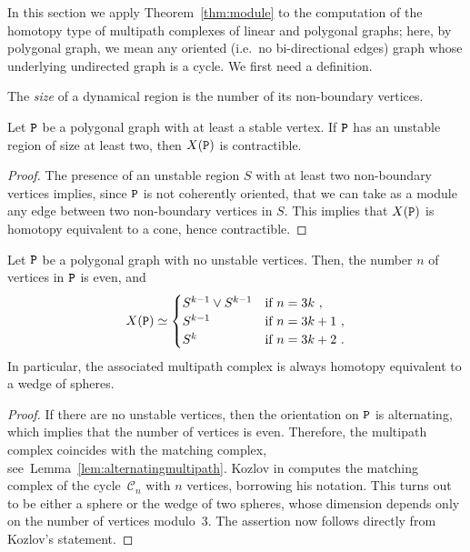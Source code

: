 \documentclass{amsart}
\begin{document}
In this section we apply Theorem~\ref{thm:module} to the computation of the homotopy type of multipath complexes of linear and polygonal graphs; here, by polygonal graph, we mean any oriented (i.e.~no bi-directional edges) graph whose underlying undirected graph is a cycle. We first need a definition.
 
 
 
 \begin{defn}
  The \emph{size} of a dynamical region is the number of its non-boundary vertices.
 \end{defn}
 


\begin{lem}
Let ${\tt P}$ be a polygonal graph with at least a stable vertex. If ${\tt P}$ has an unstable region of size at least two, then $X({\tt P})$ is contractible.
\end{lem}
\begin{proof}
The presence of an unstable region $S$ with at least two non-boundary vertices implies, since ${\tt P}$ is not coherently oriented, that we can take as a module any edge between two non-boundary vertices in $S$. This implies that $X({\tt P})$ is homotopy equivalent to a cone, hence contractible.
\end{proof}


\begin{prop}
Let ${\tt P}$ be a polygonal graph with no unstable vertices. Then, the number $n$ of vertices in ${\tt P}$ is even, and 
\[ X({\tt P}) \simeq \begin{cases} S^{k-1} \vee S^{k-1} & \text{if } n = 3k\ ,\\  S^{k-1} & \text{if }n = 3k + 1\ ,\\ S^{k} & \text{if }n = 3k + 2 \ .\\\end{cases} \]
In particular, the associated multipath complex is always homotopy equivalent to a wedge of spheres.
\end{prop}
\begin{proof}
If there are no unstable vertices, then the orientation on ${\tt P}$ is alternating, which implies that the number of vertices is even.
Therefore, the multipath complex coincides with the matching complex, see~Lemma~\ref{lem:alternatingmultipath}.
Kozlov in \cite[Proposition~5.2]{Kozlov99} computes the matching complex of the cycle~$\mathscr{C}_n$ with $n$ vertices, borrowing his notation. This turns out to be either a sphere or the wedge of two spheres, whose dimension depends only on the number of vertices modulo~$3$. The assertion now follows directly from Kozlov's statement.
\end{proof}
\end{document}
